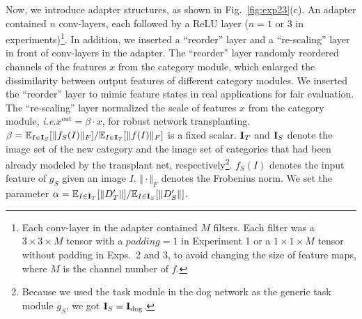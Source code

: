 \documentclass[10pt,twocolumn,letterpaper]{article}
\begin{document}
Now, we introduce adapter structures, as shown in Fig.~\ref{fig:exp23}(c). An adapter contained $n$ conv-layers, each followed by a ReLU layer ({\small$n=1$ or $3$} in experiments)\footnote[2]{Each conv-layer in the adapter contained {$M$} filters. Each filter was a {$3\times3\times M$} tensor with a $padding=1$ in Experiment 1 or a {$1\times1\times M$} tensor without padding in Exps.~2 and 3, to avoid changing the size of feature maps, where $M$ is the channel number of $f$.}. In addition, we inserted a ``reorder'' layer and a ``re-scaling'' layer\textcolor{red}{\footnotemark[1]} in front of conv-layers in the adapter. The ``reorder'' layer randomly reordered channels of the features $x$ from the category module, which enlarged the dissimilarity between output features of different category modules. We inserted the ``reorder'' layer to mimic feature states in real applications for fair evaluation. The ``re-scaling'' layer normalized the scale of features $x$ from the category module, \emph{i.e.}{\small$x^{\textrm{out}}=\beta\cdot x$}, for robust network transplanting. {\small$\beta={\mathbb E}_{I\in{\bf I}_{S}}[\Vert f_{S}(I)\Vert_{F}]/{\mathbb E}_{I\in{\bf I}_{T}}[\Vert f(I)\Vert_{F}]$} is a fixed scalar. {\small${\bf I}_{T}$} and {\small${\bf I}_{S}$} denote the image set of the new category and the image set of categories that had been already modeled by the transplant net, respectively\footnote[3]{Because we used the task module in the dog network as the generic task module $g_{S}$, we got ${\bf I}_{S}={\bf I}_{\textrm{dog}}$.}. $f_{S}(I)$ denotes the input feature of $g_{S}$ given an image $I$. $\Vert\cdot\Vert_{F}$ denotes the Frobenius norm. We set the parameter {\small$\alpha={\mathbb E}_{I\in{\bf I}_{T}}[\Vert D'_{T}\Vert]/{\mathbb E}_{I\in{\bf I}_{S}}[\Vert D'_{S}\Vert]$}.
\end{document}
